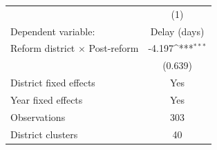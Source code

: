 {
\def\sym#1{\ifmmode^{#1}\else\(^{#1}\)\fi}
\begin{tabular}{lc}
\toprule
 & (1)\\
Dependent variable: & Delay (days)\\
\midrule
Reform district $\times$ Post-reform&      -4.197\sym{***}\\
            &     (0.639)         \\
\midrule
District fixed effects&         Yes         \\
Year fixed effects&         Yes         \\
Observations&         303         \\
District clusters&          40         \\
\bottomrule
\end{tabular}
}
